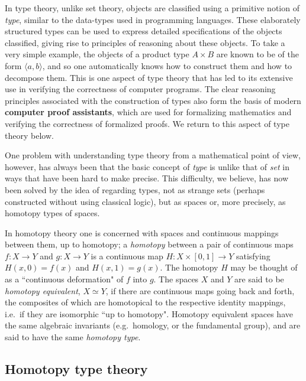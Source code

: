 {In type theory, unlike set theory, objects are classified using a primitive notion of \emph{type}, similar to the data-types used in programming languages.  These elaborately structured types can be used to express detailed specifications of the objects classified, giving rise to principles of reasoning about these objects.  To take a very simple example, the objects of a product type $A\times B$ are known to be of the form $\langle a, b\rangle$, and so one automatically knows how to construct them and how to decompose them. This is one aspect of type theory that has led to its extensive use in verifying the correctness of computer programs.  The clear reasoning principles associated with the construction of types also form the basis of modern {\bf computer proof assistants}, which are used for formalizing mathematics and verifying the correctness of formalized proofs.  We return to this aspect of type theory below.


One problem with understanding type theory from a mathematical point of view, however, has always been that the basic concept of \emph{type} is unlike that of \emph{set} in ways that have been hard to make precise. This difficulty, we believe, has now been solved by the idea of regarding types, not as strange sets (perhaps constructed without using classical logic), but as spaces or, more precisely, as homotopy types of spaces.

In homotopy theory one is concerned with spaces and continuous mappings between them, 
up to homotopy; a \emph{homotopy} between a pair of continuous maps $f \colon X	\to Y$
and  $g \colon X	\to Y$ is 
a continuous map $H \colon X \times [0, 1]	\to Y$ satisfying
$H(x, 0) = f (x)$  and $H(x, 1) = g(x)$. The homotopy $H$ may be thought of as a ``continuous deformation" of $f$ into $g$. The spaces $X$ and $Y$ are said to be \emph{homotopy equivalent}, $X\simeq Y$, if there are continuous maps going back and forth, the composites of which are homotopical to the respective identity mappings, i.e.\ if they are isomorphic ``up to homotopy".  Homotopy equivalent spaces have the same algebraic invariants (e.g.\ homology, or the fundamental group), and are said to have the same \emph{homotopy type}.

\subsection*{Homotopy type theory}

}
